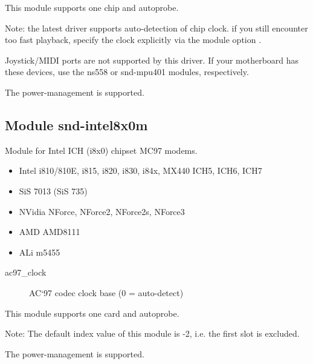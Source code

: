 \documentclass[a4paper,8pt,english]{sphinxmanual}
\begin{document}
This module supports one chip and autoprobe.

Note: the latest driver supports auto-detection of chip clock.
if you still encounter too fast playback, specify the clock
explicitly via the module option .

Joystick/MIDI ports are not supported by this driver.  If your
motherboard has these devices, use the ns558 or snd-mpu401
modules, respectively.

The power-management is supported.


\subsection{Module snd-intel8x0m}
\label{sound/alsa-configuration:module-snd-intel8x0m}
Module for Intel ICH (i8x0) chipset MC97 modems.
\begin{itemize}
\item {} 
Intel i810/810E, i815, i820, i830, i84x, MX440 ICH5, ICH6, ICH7

\item {} 
SiS 7013 (SiS 735)

\item {} 
NVidia NForce, NForce2, NForce2s, NForce3

\item {} 
AMD AMD8111

\item {} 
ALi m5455

\end{itemize}
\begin{description}
\item[{ac97\_clock}] \leavevmode
AC`97 codec clock base (0 = auto-detect)

\end{description}

This module supports one card and autoprobe.

Note: The default index value of this module is -2, i.e. the first
slot is excluded.

The power-management is supported.
\end{document}
